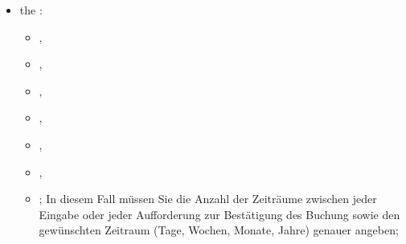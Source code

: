 \begin{itemize}
\begin{itemize}
	\end{itemize}
	\item the :
	\begin{itemize}
		\item {},
		\item {},
		\item {},
		\item {},
		\item {},
		\item {},
		\item {}; In diesem Fall müssen Sie die Anzahl der Zeiträume zwischen jeder Eingabe oder jeder Aufforderung zur Bestätigung des Buchung sowie den gewünschten Zeitraum (Tage, Wochen, Monate, Jahre) genauer angeben;

\end{itemize}
\end{itemize}

